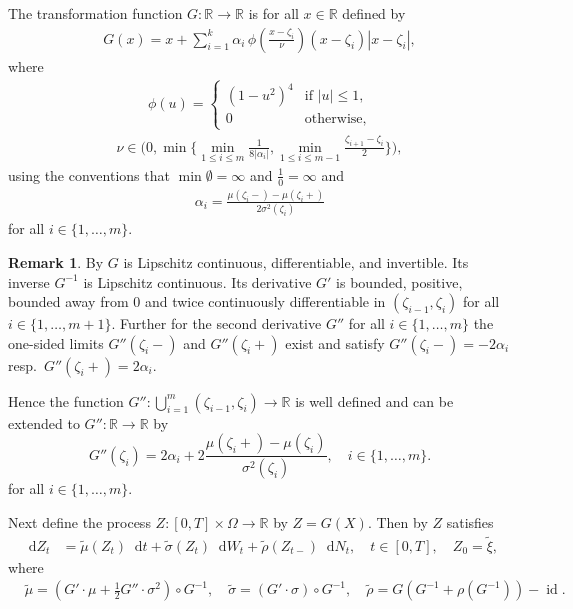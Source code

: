 \documentclass[11pt,a4paper]{article}
\numberwithin{equation}{section}
\theoremstyle{definition}
\newtheorem{remark}[theorem]{Remark}
\newcommand{\R}{{\mathbb{R}}}
\newcommand{\diff}{\mathop{}\!\mathrm{d}}
\begin{document}
The transformation function $G\colon\R\to\R$ is for all $x\in\R$ defined by 
\begin{align}\label{eq:G-1d}
G(x)=x+ \sum_{i=1}^k \alpha_i\, \phi\!\left(\frac{x-\zeta_i}{\nu}\right)(x-\zeta_i)|x-\zeta_i|, 
\end{align}
where 
\begin{align}\label{eq:bump}
\phi(u)=
\begin{cases}
(1-u^2)^4 & \text{if } |u|\leq 1,\\
0 & \text{otherwise},
\end{cases}
\end{align}
\begin{align*}
\nu\in\Big(0,\min\bigg\{\min\limits_{1\le i\le m}\frac{1}{8|\alpha_i|},\min\limits_{1\le i\le m-1}\frac{\zeta_{i+1}-\zeta_i}{2}\bigg\} \Big),
\end{align*}
using the conventions that $\min \emptyset =\infty$ and $\frac{1}{0} = \infty$ and 
\begin{equation}\label{alpha}
\begin{aligned}
\alpha_i = \frac{\mu(\zeta_i -)- \mu(\zeta_i +)}{2\sigma^2(\zeta_i)}
\end{aligned}
\end{equation}
for all $i\in\{1,\ldots,m\}$.

\begin{remark}
    By \cite[Lemma 1]{muellergronbach2019b} $G$ is Lipschitz continuous, differentiable, and invertible. Its inverse $G^{-1}$ is Lipschitz continuous. Its derivative $G'$ is bounded, positive, bounded away from 0 and twice continuously differentiable in $(\zeta_{i-1},\zeta_i)$ for all $i\in\{1,\dots,m+1\}$. Further for the second derivative $G''$ for all $i\in\{1,\dots,m\}$ the one-sided limits  $G''(\zeta_i-) $ and $G''(\zeta_i+)$ exist and satisfy $ G''(\zeta_i-) = -2\alpha_i$ resp.~$G''(\zeta_i+) = 2\alpha_i$.
\end{remark}

Hence the function $G''\colon\bigcup_{i=1}^m (\zeta_{i-1},\zeta_i) \to \R$ is well defined and can be extended to $G''\colon\R\to\R$ by
\begin{equation}\label{exG2}
G''(\zeta_i) = 2\alpha_i + 2 \frac{\mu(\zeta_i+)-\mu(\zeta_i)}{\sigma^2(\zeta_i)}, \quad i\in\{1,\ldots,m\}.
\end{equation}
for all $i\in\{1,\ldots ,m\}$.

Next define the process $Z\colon[0,T]\times\Omega\to \R$ by $Z = G(X)$. Then by \cite[Theorem 3.1]{PS20} $Z$ satisfies 
\begin{align}
\diff Z_t &=\widetilde \mu(Z_t)  \diff t + \widetilde \sigma(Z_t) \diff W_t+\widetilde \rho(Z_{t-})\diff N_t , \quad t\in[0,T], \quad Z_0=\widetilde \xi,
\end{align}
where 
\begin{equation}\label{eqTCoeff}
\begin{aligned}
&\widetilde \mu = (G'\cdot \mu +\frac{1}{2} G''\cdot\sigma^2) \circ G^{-1}, \quad \widetilde \sigma = (G'\cdot \sigma) \circ G^{-1}, \quad \widetilde \rho = G(G^{-1} +\rho(G^{-1})) - \operatorname{id}.
\end{aligned}
\end{equation}
\end{document}
